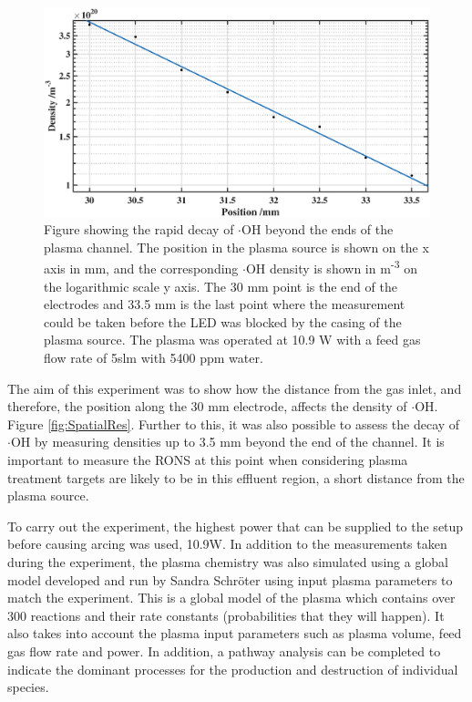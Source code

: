\documentclass[11pt, oneside]{article}   	%
\begin{document}
\begin{figure}
	\centering
	\includegraphics[width=\textwidth]{Figures/OHDecayBig.eps}
	\caption{Figure showing the rapid decay of $\cdot$OH beyond the ends of the plasma channel. The position in the plasma source is shown on the x axis in mm, and the corresponding $\cdot$OH density is shown in m\textsuperscript{-3} on the logarithmic scale y axis. The 30 mm point is the end of the electrodes and 33.5 mm is the last point where the measurement could be taken before the LED was blocked by the casing of the plasma source. The plasma was operated at 10.9 W with a feed gas flow rate of 5slm with 5400 ppm water.}
	\label{fig:OH decay}
\end{figure}

The aim of this experiment was to show how the distance from the gas inlet, and therefore, the position along the 30 mm electrode, affects the density of $\cdot$OH. Figure \ref{fig:SpatialRes}.
Further to this, it was also possible to assess the decay of $\cdot$OH by measuring densities up to 3.5 mm beyond the end of the channel.
It is important to measure the RONS at this point when considering plasma treatment targets are likely to be in this effluent region, a short distance from the plasma source.

To carry out the experiment, the highest power that can be supplied to the setup before causing arcing was used, 10.9W.
In addition to the measurements taken during the experiment, the plasma chemistry was also simulated using a global model developed and run by Sandra Schr\"{o}ter using input plasma parameters to match the experiment.
This is a global model of the plasma which contains over 300 reactions and their rate constants (probabilities that they will happen). It also takes into account the plasma input parameters such as plasma volume, feed gas flow rate and power. In addition, a pathway analysis can be completed to indicate the dominant processes for the production and destruction of individual species.
\end{document}
